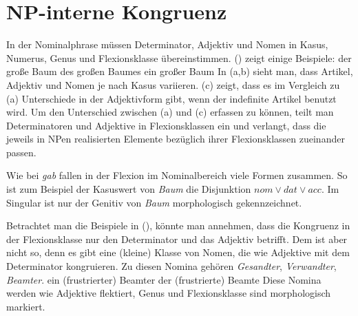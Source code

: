 \section{NP-interne Kongruenz}
\label{sec-np-kongruenz}

In
der Nominalphrase müssen Determinator, Adjektiv und Nomen in Kasus, Numerus, Genus 
und Flexionsklasse übereinstimmen. () zeigt einige Beispiele:
\eal
\ex der große  Baum
\ex des großen Baumes
\ex ein großer Baum
\zl
In (a,b) sieht man, dass Artikel, Adjektiv und Nomen je nach Kasus variieren. (c)
zeigt, dass es im Vergleich zu (a) Unterschiede in der Adjektivform gibt, wenn
der indefinite Artikel benutzt wird. Um den Unterschied zwischen (a) und (c)
erfassen zu können, teilt man Determinatoren und Adjektive in Flexionsklassen ein und
verlangt, dass die jeweils in NPen realisierten Elemente bezüglich ihrer Flexionsklassen
zueinander passen.

Wie bei \emph{gab} fallen in der Flexion im Nominalbereich viele Formen zusammen.
So ist zum Beispiel der Kasuswert von \emph{Baum} die Disjunktion
$nom \vee dat \vee acc$.
Im Singular ist nur der Genitiv von \emph{Baum} morphologisch gekennzeichnet.

Betrachtet man die Beispiele in (), könnte man annehmen, dass die Kongruenz
in der Flexionsklasse nur den Determinator und das Adjektiv betrifft. Dem ist aber nicht so,
denn es gibt eine (kleine) Klasse von Nomen, die wie Adjektive mit dem Determinator kongruieren.
Zu diesen Nomina gehören \emph{Gesandter}, \emph{Verwandter}, \emph{Beamter}.
\eal
\ex ein (frustrierter) Beamter
\ex der (frustrierte)  Beamte
\zl
Diese Nomina werden wie Adjektive flektiert, Genus und Flexionsklasse sind morphologisch markiert.



